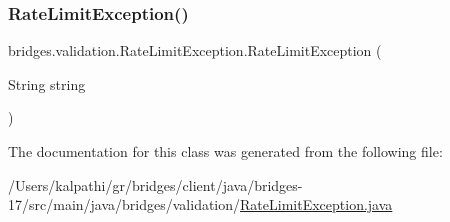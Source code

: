 \subsubsection{\texorpdfstring{Rate\+Limit\+Exception()}{RateLimitException()}}
{\footnotesize\ttfamily bridges.\+validation.\+Rate\+Limit\+Exception.\+Rate\+Limit\+Exception (\begin{DoxyParamCaption}\item[{String}]{string }\end{DoxyParamCaption})}



The documentation for this class was generated from the following file\+:\begin{DoxyCompactItemize}
\item 
/\+Users/kalpathi/gr/bridges/client/java/bridges-\/17/src/main/java/bridges/validation/\mbox{\hyperlink{_rate_limit_exception_8java}{Rate\+Limit\+Exception.\+java}}\end{DoxyCompactItemize}
